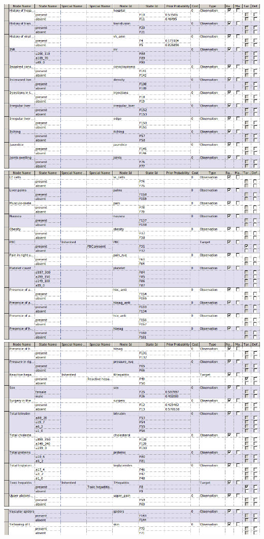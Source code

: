 \documentclass{article}
\begin{document}
\begin{enumerate}[label=\alph*)]
\begin{flushleft}
\includegraphics[scale=0.4]{hepa4.png}
\includegraphics[scale=0.4]{hepa5.png}
\includegraphics[scale=0.4]{hepa6.png}
\includegraphics[scale=0.4]{hepa7.png}
\end{flushleft}


\end{enumerate}
\end{document}
